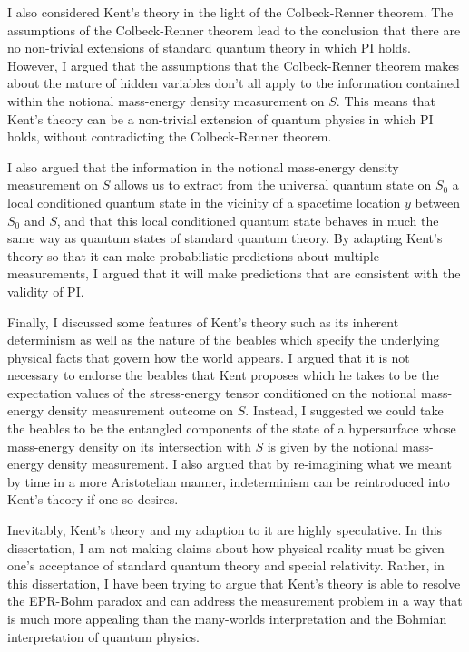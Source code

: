 \documentclass[12pt]{report}
\begin{document}
I also considered Kent's theory in the light of the Colbeck-Renner theorem. The assumptions of the Colbeck-Renner theorem lead to the conclusion that there are no non-trivial extensions of standard quantum theory in which PI holds. However, I argued that the assumptions that the Colbeck-Renner theorem makes about the nature of hidden variables don't all apply to the information contained within the notional mass-energy density measurement on $S$. This means that Kent's theory can be a non-trivial extension of quantum physics in which PI holds, without contradicting the Colbeck-Renner theorem. 

I also argued that the information in the notional mass-energy density measurement on $S$ allows us to extract from the universal quantum state on $S_0$ a local conditioned quantum state in the vicinity of a spacetime location $y$ between $S_0$ and $S$, and that this local conditioned quantum state behaves in much the same way as quantum states of standard quantum theory. By adapting Kent's theory so that it can make probabilistic predictions about multiple measurements, I argued that it will make predictions that are consistent with the validity of PI. 

Finally, I discussed some features of Kent's theory such as its inherent determinism as well as the nature of the beables which specify the underlying physical facts that govern how the world appears. I argued that it is not necessary to endorse the beables that Kent proposes which he takes to be the expectation values of the stress-energy tensor conditioned on the notional mass-energy density measurement outcome on $S$. Instead, I suggested we could take the beables to be the entangled components of the state of a hypersurface whose mass-energy density on its intersection with $S$ is given by the notional mass-energy density measurement. I also argued that by re-imagining what we meant by time in a more Aristotelian manner, indeterminism can be reintroduced into Kent's theory if one so desires. 

Inevitably, Kent's theory and my adaption to it are highly speculative. In this dissertation, I am not making claims about how physical reality must be given one's acceptance of standard quantum theory and special relativity. Rather, in this dissertation, I have been trying to argue that Kent's theory is able to resolve the EPR-Bohm paradox and can address the measurement problem in a way that is much more appealing than the many-worlds interpretation and the Bohmian interpretation of quantum physics.


\pagebreak
{} 
\printbibliography

\pagebreak
{}

\singlespacing 

\printnomenclature[3.7cm]


\printindex 
\end{document}
